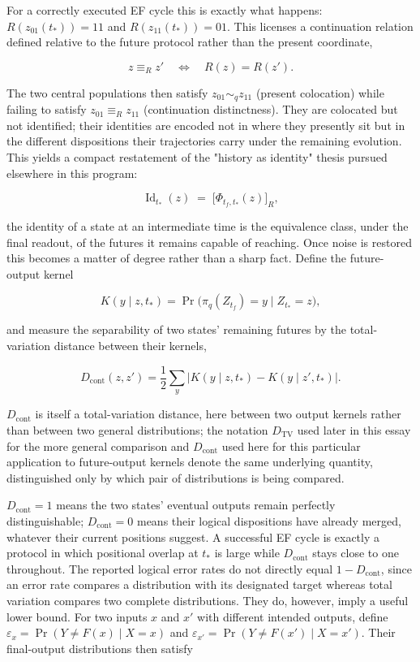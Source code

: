\documentclass[11pt]{article}
\begin{document}
For a correctly executed EF cycle this is exactly what happens: $R(z_{01}(t_\ast))=11$ and $R(z_{11}(t_\ast))=01$. This licenses a continuation relation defined relative to the future protocol rather than the present coordinate,

\[
z\equiv_R z'
\quad\Longleftrightarrow\quad
R(z)=R(z').
\]

The two central populations then satisfy $z_{01}\sim_q z_{11}$ (present colocation) while failing to satisfy $z_{01}\equiv_R z_{11}$ (continuation distinctness). They are colocated but not identified; their identities are encoded not in where they presently sit but in the different dispositions their trajectories carry under the remaining evolution. This yields a compact restatement of the "history as identity" thesis pursued elsewhere in this program:

\[
\operatorname{Id}_{t_\ast}(z)\;=\;\bigl[\Phi_{t_f,t_\ast}(z)\bigr]_R,
\]

the identity of a state at an intermediate time is the equivalence class, under the final readout, of the futures it remains capable of reaching. Once noise is restored this becomes a matter of degree rather than a sharp fact. Define the future-output kernel

\[
K(y\mid z,t_\ast) = \Pr\bigl(\pi_q(Z_{t_f})=y \mid Z_{t_\ast}=z\bigr),
\]

and measure the separability of two states' remaining futures by the total-variation distance between their kernels,

\[
D_{\mathrm{cont}}(z,z') = \frac12\sum_y \bigl|K(y\mid z,t_\ast)-K(y\mid z',t_\ast)\bigr|.
\]

$D_{\mathrm{cont}}$ is itself a total-variation distance, here between two output kernels rather than between two general distributions; the notation $D_{\mathrm{TV}}$ used later in this essay for the more general comparison and $D_{\mathrm{cont}}$ used here for this particular application to future-output kernels denote the same underlying quantity, distinguished only by which pair of distributions is being compared.

$D_{\mathrm{cont}}=1$ means the two states' eventual outputs remain perfectly distinguishable; $D_{\mathrm{cont}}=0$ means their logical dispositions have already merged, whatever their current positions suggest. A successful EF cycle is exactly a protocol in which positional overlap at $t_\ast$ is large while $D_{\mathrm{cont}}$ stays close to one throughout. The reported logical error rates do not directly equal $1-D_{\mathrm{cont}}$, since an error rate compares a distribution with its designated target whereas total variation compares two complete distributions. They do, however, imply a useful lower bound. For two inputs $x$ and $x'$ with different intended outputs, define $\varepsilon_x = \Pr(Y\neq F(x)\mid X=x)$ and $\varepsilon_{x'} = \Pr(Y\neq F(x')\mid X=x')$. Their final-output distributions then satisfy
\end{document}
